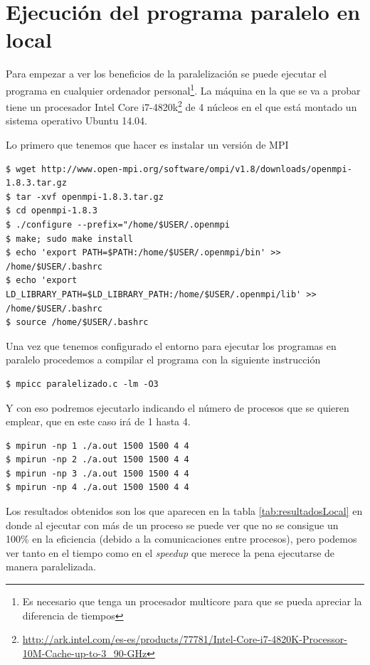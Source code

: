 \documentclass{article}
\begin{document}
\clearpage

\section{Ejecución del  programa paralelo en local}\label{sec:ejLocal}
	Para empezar a ver los beneficios de la paralelización se puede ejecutar el programa en cualquier ordenador personal\footnote{Es necesario que tenga un procesador multicore para que se pueda apreciar la diferencia de tiempos}. La máquina en la que se va a probar tiene un procesador Intel Core i7-4820k\footnote{\url{http://ark.intel.com/es-es/products/77781/Intel-Core-i7-4820K-Processor-10M-Cache-up-to-3_90-GHz}} de 4 núcleos en el que está montado un sistema operativo Ubuntu 14.04.
	
	Lo primero que tenemos que hacer es instalar un versión de MPI
\begin{lstlisting}[style=minibash]
$ wget http://www.open-mpi.org/software/ompi/v1.8/downloads/openmpi-1.8.3.tar.gz
$ tar -xvf openmpi-1.8.3.tar.gz
$ cd openmpi-1.8.3
$ ./configure --prefix="/home/$USER/.openmpi
$ make; sudo make install
$ echo 'export PATH=$PATH:/home/$USER/.openmpi/bin' >> /home/$USER/.bashrc
$ echo 'export LD_LIBRARY_PATH=$LD_LIBRARY_PATH:/home/$USER/.openmpi/lib' >> /home/$USER/.bashrc
$ source /home/$USER/.bashrc
\end{lstlisting}

	Una vez que tenemos configurado el entorno para ejecutar los programas en paralelo procedemos a compilar el programa con la siguiente instrucción
\begin{lstlisting}[style=minibash]
$ mpicc paralelizado.c -lm -O3
\end{lstlisting}
	Y con eso podremos ejecutarlo indicando el número de procesos que se quieren emplear, que en este caso irá de 1 hasta 4.
\begin{lstlisting}[style=minibash]
$ mpirun -np 1 ./a.out 1500 1500 4 4
$ mpirun -np 2 ./a.out 1500 1500 4 4
$ mpirun -np 3 ./a.out 1500 1500 4 4
$ mpirun -np 4 ./a.out 1500 1500 4 4
\end{lstlisting}

	Los resultados obtenidos son los que aparecen en la tabla \ref{tab:resultadosLocal} en donde al ejecutar con más de un proceso se puede ver que no se consigue un 100\% en la eficiencia (debido a la comunicaciones entre procesos), pero podemos ver tanto en el tiempo como en el \textit{speedup} que merece la pena ejecutarse de manera paralelizada.
	
\end{document}
